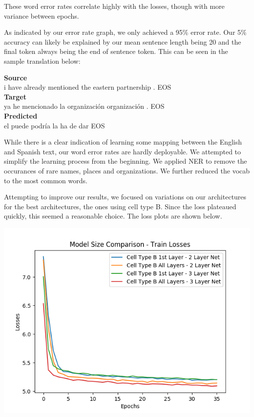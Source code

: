 \documentclass[letterpaper, 10pt]{article}
\begin{document}
\begin{multicols}{2}
These word error rates correlate highly with the losses, though with more variance between epochs.

As indicated by our error rate graph, we only achieved a 95\% error rate.
Our 5\% accuracy can likely be explained by our mean sentence length being 20 and the final token
always being the end of sentence token.
This can be seen in the sample translation below:

\bigskip
\noindent \textbf{Source}\\
i have already mentioned the eastern partnership . EOS\\
\textbf{Target}\\
ya he mencionado la organización organización . EOS\\
\textbf{Predicted}\\
el puede podría la ha de dar EOS
\bigskip

While there is a clear indication of learning some mapping between the English and Spanish text,
our word error rates are hardly deployable.
We attempted to simplify the learning process from the beginning.
We applied NER to remove the occurances of rare names, places and organizations.
We further reduced the vocab to the most common words.

Attempting to improve our results, we focused on variations on our architectures for the best
architectures, the ones using cell type B.
Since the loss plateaued quickly, this seemed a reasonable choice.
The loss plots are shown below.

\begin{center}
\includegraphics[scale=.4]{size_comparison_losses_train}
\end{center}


\end{multicols}
\end{document}
